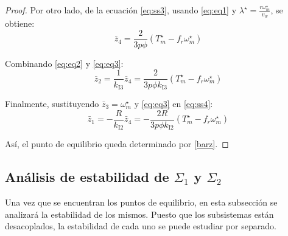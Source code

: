\begin{lemma}
\begin{proof}
        Por otro lado, de la ecuación \eqref{eq:ss3}, usando \eqref{eq:eq1} y $\lambda^\star = \frac{r\omega^\star_m}{v_w}$, se obtiene:
        \begin{equation}
        \bar{z}_4 = \frac{2}{3p\phi}(T^\star_m - f_r\omega^\star_m) \label{eq:eq3}
        \end{equation}

        Combinando \eqref{eq:eq2} y \eqref{eq:eq3}:
        \begin{equation}
        \bar{z}_2 = \frac{1}{k_{\textrm{I3}}}\bar{z}_4 = \frac{2}{3p\phi k_{\textrm{I3}}}(T^\star_m - f_r\omega^\star_m) \label{eq:eq4}
        \end{equation}

        Finalmente, sustituyendo $\bar{z}_3 = \omega^\star_m$ y \eqref{eq:eq3} en \eqref{eq:ss4}:
        \begin{equation}
        \bar{z}_1 = -\frac{R}{k_{\textrm{I2}}}\bar{z}_4 = -\frac{2R}{3p\phi k_{\textrm{I2}}}(T^\star_m - f_r\omega^\star_m) \label{eq:eq5}
        \end{equation}

        Así, el punto de equilibrio queda determinado por \eqref{barz}.
    \end{proof}
\end{lemma}

\subsection{Análisis de estabilidad de \texorpdfstring{$\Sigma_1$ y $\Sigma_2$}{Sigma 1 y Sigma 1}}
\label{sec:analisis_sigmas}

Una vez que se encuentran los puntos de equilibrio, en esta subsección se analizará la estabilidad de 
los mismos. Puesto que los subsistemas están desacoplados, la estabilidad de cada uno se puede estudiar 
por separado.\\


